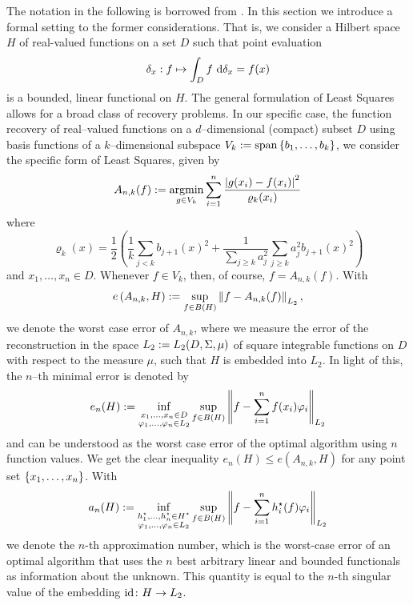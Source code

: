 \documentclass[12pt, oneside]{amsart}
\theoremstyle{definition}
\theoremstyle{remark}
\numberwithin{equation}{section}
\begin{document}
The notation in the following is borrowed from \cite{Ullrich_2020}.
In this section we introduce a formal setting to the former considerations. That is, we consider a Hilbert space \(H\) of real-valued functions on a set \(D\) such that point evaluation \[
    \delta_x: f \mapsto \int_D f\ \d \delta_x = f(x)
\]
is a bounded, linear functional on \(H\).
The general formulation of Least Squares allows for a broad class of recovery 
problems. In our specific case, the function recovery of real--valued functions 
on a \(d\)--dimensional (compact) subset \(D\) using basis functions of a 
\(k\)--dimensional subspace \(V_k \defn \spn \set{b_1, \dots, b_k}\), we 
consider the specific form of Least Squares, given by\[
    A_{n, k}(f) \defn \argmin_{g \in V_k} \sum_{i=1}^n \frac{\abs{g(x_i) - f(x_i)}^2}{\varrho_k(x_i)}
\]
where \[
    \varrho_k(x) = \frac{1}{2} \left( \frac{1}{k} \sum_{j < k} b_{j+1}(x)^2 + \frac{1}{\sum_{j \geq k} a_j^2} \sum_{j \geq k} a_j^2 b_{j+1}(x)^2 \right)
\]
and \(x_1, \dots, x_n \in D\). Whenever \(f \in V_k\), then, of course, \(f = A_{n, k}(f)\). With
\begin{equation}\label{eq:worstCaseError}
    e\left(A_{n,k}, H\right) \defn \sup_{f \in B(H)} \norm[L_2]{f - A_{n,k}(f)},
\end{equation}
we denote the worst case error of \(A_{n,k}\), where we measure the error of the reconstruction in the space \(L_2 \defn L_2(D, \Sigma, \mu)\) of square integrable functions on \(D\) with respect to the measure \(\mu\), such that \(H\) is embedded into \(L_2\). In light of this, the \(n\)--th minimal error is denoted by \[
    e_n(H) \defn \inf_{\substack{x_1, \dots, x_n \in D \\ \phi_1, \dots, \phi_n 
    \in L_2}} \sup_{f \in B(H)} \norm[L_2]{f - \sum_{i=1}^n f(x_i) \phi_i}
\]
and can be understood as the worst case error of the optimal algorithm using \(n\) function values. We get the clear inequality \(e_n(H) \leq e(A_{n,k}, H)\) for any point set \(\set{x_1, \dots, x_n}\). With \[
    a_n(H) \defn \inf_{\substack{h_1^\star, \dots, h_n^\star \in H^\star \\ 
    \phi_1, \dots, \phi_n \in L_2}} \sup_{f \in B(H)} \norm[L_2]{f - 
    \sum_{i=1}^n h_i^\star(f) \phi_i}
\]
we denote the \(n\)-th approximation number, which is the worst-case error of 
an optimal algorithm that uses the \(n\) best arbitrary linear and bounded 
functionals as information about the unknown. This quantity is equal to the 
\(n\)-th singular value of the embedding \(\id\from H \to L_2\).
\end{document}
